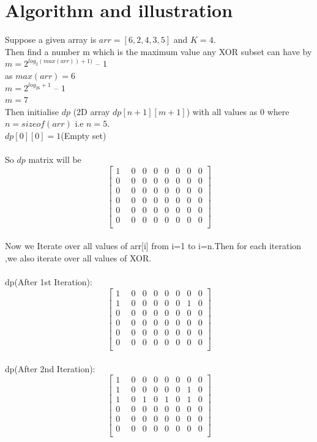 \documentclass[conference]{IEEEtran}
\begin{document}
\section{Algorithm and illustration}
Suppose a given array is $arr=[6,2,4,3,5]$ and $K=4$.\\
Then find a number m which is the maximum value any XOR subset can have by \\
$m = 2^{log_2(max(arr))+1)}$ – $1$\\
as $max(arr)=6$\\
$m = 2^{log_26+1}$ – $1$\\
$m=7$\\
Then initialise $dp$ (2D array  $dp[n+1][m+1]$) with all values as 0 where $n= sizeof(arr)$ i.e $n=5$.\\
$dp[0][0]=1 $(Empty set)\\\\
So $dp$ matrix will be
$$
\begin{bmatrix}
1 & 0 & 0 & 0 & 0 & 0 & 0 & 0\\
0 & 0 & 0 & 0 & 0 & 0 & 0 & 0\\
0 & 0 & 0 & 0 & 0 & 0 & 0 & 0\\
0 & 0 & 0 & 0 & 0 & 0 & 0 & 0\\
0 & 0 & 0 & 0 & 0 & 0 & 0 & 0\\
0 & 0 & 0 & 0 & 0 & 0 & 0 & 0\\
\quad 
\end{bmatrix}
$$
\\
Now we Iterate over all values of arr[i] from i=1 to i=n.Then for each iteration ,we also iterate over all values of XOR.\\\\
dp(After 1st Iteration):\\
$$
\begin{bmatrix}
1 & 0 & 0 & 0 & 0 & 0 & 0 & 0\\
1 & 0 & 0 & 0 & 0 & 0 & 1 & 0\\
0 & 0 & 0 & 0 & 0 & 0 & 0 & 0\\
0 & 0 & 0 & 0 & 0 & 0 & 0 & 0\\
0 & 0 & 0 & 0 & 0 & 0 & 0 & 0\\
0 & 0 & 0 & 0 & 0 & 0 & 0 & 0\\
\quad
\end{bmatrix}
$$
\\
dp(After 2nd Iteration):\\
$$
\begin{bmatrix}
1 & 0 & 0 & 0 & 0 & 0 & 0 & 0\\
1 & 0 & 0 & 0 & 0 & 0 & 1 & 0\\
1 & 0 & 1 & 0 & 1 & 0 & 1 & 0\\
0 & 0 & 0 & 0 & 0 & 0 & 0 & 0\\
0 & 0 & 0 & 0 & 0 & 0 & 0 & 0\\
0 & 0 & 0 & 0 & 0 & 0 & 0 & 0\\
\quad
\end{bmatrix}
$$
\end{document}
